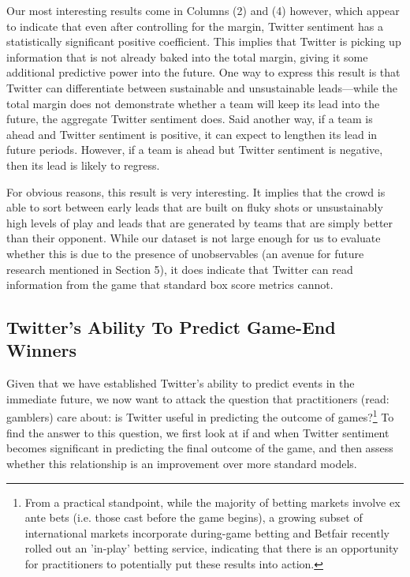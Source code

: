 \documentclass[12pt]{article}
\begin{document}
\begin{doublespacing}
Our most interesting results come in Columns (2) and (4) however, which appear to indicate that even after controlling for the margin, Twitter sentiment has a statistically significant positive coefficient. This implies that Twitter is picking up information that is not already baked into the total margin, giving it some additional predictive power into the future. One way to express this result is that Twitter can differentiate between sustainable and unsustainable leads---while the total margin does not demonstrate whether a team will keep its lead into the future, the aggregate Twitter sentiment does. Said another way, if a team is ahead and Twitter sentiment is positive, it can expect to lengthen its lead in future periods. However, if a team is ahead but Twitter sentiment is negative, then its lead is likely to regress. 

For obvious reasons, this result is very interesting. It implies that the crowd is able to sort between early leads that are built on fluky shots or unsustainably high levels of play and leads that are generated by teams that are simply better than their opponent. While our dataset is not large enough for us to evaluate whether this is due to the presence of unobservables (an avenue for future research mentioned in Section 5), it does indicate that Twitter can read information from the game that standard box score metrics cannot.

\subsection{Twitter's Ability To Predict Game-End Winners}

Given that we have established Twitter's ability to predict events in the immediate future, we now want to attack the question that practitioners (read: gamblers) care about: is Twitter useful in predicting the outcome of games?\footnote{From a practical standpoint, while the majority of betting markets involve ex ante bets (i.e. those cast before the game begins), a growing subset of international markets incorporate during-game betting and Betfair recently rolled out an 'in-play' betting service, indicating that there is an opportunity for practitioners to potentially put these results into action.}
To find the answer to this question, we first look at if and 
when Twitter sentiment becomes significant in predicting the 
final outcome of the game, and then assess whether this 
relationship is an improvement over more standard models. 


\end{doublespacing}
\end{document}
